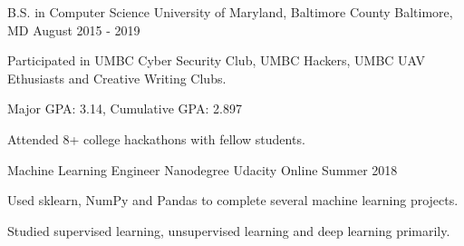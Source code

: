 \begin{cventries}
  \cventry
    {B.S. in Computer Science}
    {University of Maryland, Baltimore County}
    {Baltimore, MD}
    {August 2015 - 2019}
    {
      \begin{cvitems}
        \item {Participated in UMBC Cyber Security Club, UMBC Hackers, UMBC UAV Ethusiasts and Creative Writing Clubs.}
        \item {Major GPA: 3.14, Cumulative GPA: 2.897}
        \item {Attended 8+ college hackathons with fellow students.}
      \end{cvitems}
    }
  \cventry
    {Machine Learning Engineer Nanodegree}
    {Udacity}
    {Online}
    {Summer 2018}
    {
     \begin{cvitems}
        \item {Used sklearn, NumPy and Pandas to complete several machine learning projects.}
        \item {Studied supervised learning, unsupervised learning and deep learning primarily.}
     \end{cvitems}
    }
\end{cventries}
